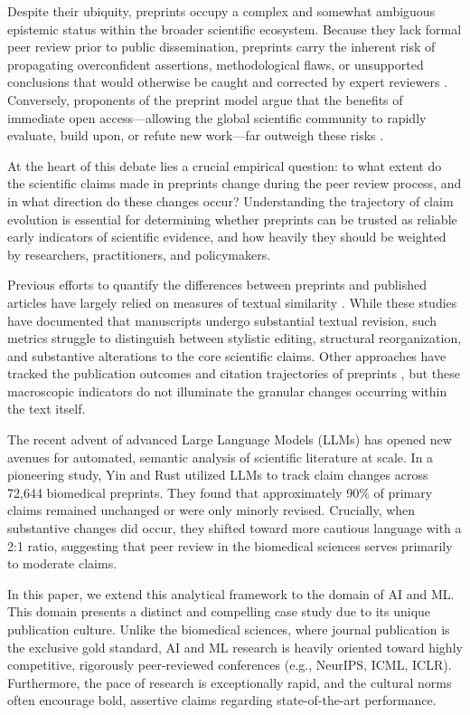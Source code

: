 \documentclass[11pt]{article}
\begin{document}
Despite their ubiquity, preprints occupy a complex and somewhat ambiguous epistemic status within the broader scientific ecosystem. Because they lack formal peer review prior to public dissemination, preprints carry the inherent risk of propagating overconfident assertions, methodological flaws, or unsupported conclusions that would otherwise be caught and corrected by expert reviewers \cite{rawlinson2020}. Conversely, proponents of the preprint model argue that the benefits of immediate open access---allowing the global scientific community to rapidly evaluate, build upon, or refute new work---far outweigh these risks \cite{berg2016}.

At the heart of this debate lies a crucial empirical question: to what extent do the scientific claims made in preprints change during the peer review process, and in what direction do these changes occur? Understanding the trajectory of claim evolution is essential for determining whether preprints can be trusted as reliable early indicators of scientific evidence, and how heavily they should be weighted by researchers, practitioners, and policymakers.

Previous efforts to quantify the differences between preprints and published articles have largely relied on measures of textual similarity \cite{klein2019, carneiro2020}. While these studies have documented that manuscripts undergo substantial textual revision, such metrics struggle to distinguish between stylistic editing, structural reorganization, and substantive alterations to the core scientific claims. Other approaches have tracked the publication outcomes and citation trajectories of preprints \cite{abdill2019, serghiou2018}, but these macroscopic indicators do not illuminate the granular changes occurring within the text itself.

The recent advent of advanced Large Language Models (LLMs) has opened new avenues for automated, semantic analysis of scientific literature at scale. In a pioneering study, Yin and Rust \cite{yin2026} utilized LLMs to track claim changes across 72,644 biomedical preprints. They found that approximately 90\% of primary claims remained unchanged or were only minorly revised. Crucially, when substantive changes did occur, they shifted toward more cautious language with a 2:1 ratio, suggesting that peer review in the biomedical sciences serves primarily to moderate claims.

In this paper, we extend this analytical framework to the domain of AI and ML. This domain presents a distinct and compelling case study due to its unique publication culture. Unlike the biomedical sciences, where journal publication is the exclusive gold standard, AI and ML research is heavily oriented toward highly competitive, rigorously peer-reviewed conferences (e.g., NeurIPS, ICML, ICLR). Furthermore, the pace of research is exceptionally rapid, and the cultural norms often encourage bold, assertive claims regarding state-of-the-art performance.
\end{document}

